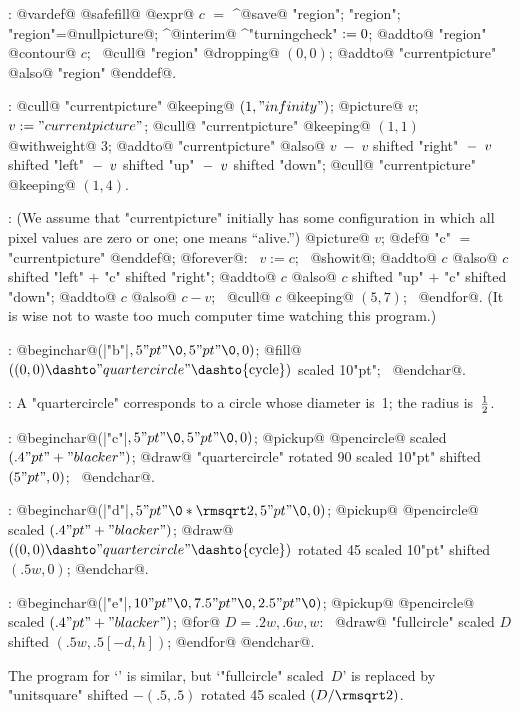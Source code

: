 :
 @vardef@ @safefill@ @expr@ $c$ $=$ ^@save@ "region";\parbreak
\quad@picture@ "region"; "region"=@nullpicture@;\parbreak
\quad^@interim@ ^"turningcheck"$\null:=0$;\parbreak
\quad @addto@ "region" @contour@ $c$; \
 @cull@ "region" @dropping@ $(0,0)$;\parbreak
\quad @addto@ "currentpicture" @also@ "region" @enddef@.

:
 @cull@ "currentpicture" @keeping@ $(1,"infinity")$;\parbreak
@picture@ $v$; \  $v:="currentpicture"$;\parbreak
@cull@ "currentpicture" @keeping@ $(1,1)$ @withweight@ 3;\parbreak
@addto@ "currentpicture" @also@
 $v\;-\;v$ shifted "right"\parbreak
\qquad $\null-\;v$ shifted "left"
 $\null-\;v$ shifted "up"
 $\null-\;v$ shifted "down";\parbreak
@cull@ "currentpicture" @keeping@ $(1,4)$.

:
 (We assume that "currentpicture" initially has some configuration
in which all pixel values are zero or one; one means ``alive.'')
\begindisplay
@picture@ $v$; @def@ "c" $=$ "currentpicture" @enddef@;\cr
@forever@: \ $v:=c$; \ @showit@;\cr
\quad @addto@ $c$ @also@ $c$ shifted "left" $+$ "c" shifted "right";\cr
\quad @addto@ $c$ @also@ $c$ shifted "up" $+$ "c" shifted "down";\cr
\quad @addto@ $c$ @also@ $c-v$; \ @cull@ $c$ @keeping@ $(5,7)$; \ @endfor@.\cr
\enddisplay
(It is wise not to waste too much computer time watching this program.)

:
 @beginchar@\kern1pt(|"b"|$,5"pt"\0,5"pt"\0,0)$;\parbreak
@fill@ $((0,0)\dashto"quartercircle"\dashto{\rm cycle})$
scaled 10"pt"; \ @endchar@.

:
 A "quartercircle" corresponds to a circle whose diameter
is~1; the radius is~$1\over2$.

:
 @beginchar@\kern1pt(|"c"|$,5"pt"\0,5"pt"\0,0)$;\parbreak
@pickup@ @pencircle@ scaled $(.4"pt"+"blacker")$;\parbreak
@draw@ "quartercircle" rotated 90 scaled 10"pt" shifted $(5"pt",0)$;
 \ @endchar@.

:
 @beginchar@\kern1pt(|"d"|$,5"pt"\0\ast\rmsqrt2,5"pt"\0,0)$;\parbreak
@pickup@ @pencircle@ scaled $(.4"pt"+"blacker")$;\parbreak
@draw@ $((0,0)\dashto"quartercircle"\dashto{\rm cycle})$
 rotated 45 scaled 10"pt" shifted $(.5w,0)$;\parbreak
@endchar@.

:
 @beginchar@\kern1pt(|"e"|$,10"pt"\0,7.5"pt"\0,2.5"pt"\0)$;\parbreak
@pickup@ @pencircle@ scaled $(.4"pt"+"blacker")$;\parbreak
@for@ $D=.2w,.6w,w$: \
@draw@ "fullcircle" scaled $D$ shifted $(.5w,.5[-d,h])$;\parbreak
@endfor@ @endchar@.
\par\medskip\noindent
The program for `{\manual\circf}' is similar, but `"fullcircle"
scaled~$D$' is replaced by
\begindisplay
"unitsquare" shifted $-(.5,.5)$ rotated 45 scaled $(D/\rmsqrt2)$.
\enddisplay


